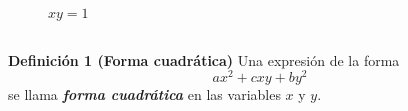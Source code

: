 {\begin{frame}
\begin{columns}[c]
\begin{column}{0.45\textwidth}
\begin{figure}
\begin{subfigure}[b]{\textwidth}
				\end{subfigure}				
				\vspace{0mm}
				\caption{$xy=1$}
			\end{figure}	
		\end{column}
\end{columns}	

\vspace{-1mm}
\begin{block}{\textbf{Definición 1 (Forma cuadrática)}}
	\justifying
	Una expresión de la forma
	\[
	ax^2+cxy+by^2
	\]
	se llama \textbf{\textit{forma cuadrática}} en las variables $x$ y $y$. 
\end{block}

\end{frame}
}


\subsection{}

